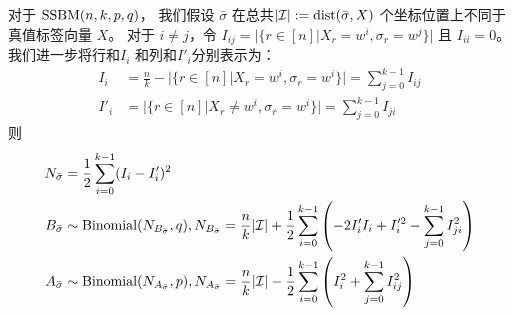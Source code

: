 \begin{lemma}\label{lem:minus}
	对于 $\operatorname{SSBM}(n,k,p,q)$，
  我们假设 $\bar{\sigma}$ 
  在总共$|\mathcal{I}|:=\operatorname{dist}(\bar{\sigma}, X)$ 
  个坐标位置上不同于真值标签向量
  $X$。
	对于 $i\neq j$，令 $I_{ij} = \Big|\{r\in [n] \big| X_r = w^i, \sigma_r = w^j \}\Big|$
  且 $I_{ii} = 0$。
  我们进一步将行和$I_i$
  和列和$I'_i$分别表示为：
  \begin{align}
  I_i &= \frac{n}{k} -
  \Big|\{r\in [n] \big| X_r = w^i, \sigma_r=w^i \}\Big|
  =
  \sum_{j=0}^{k-1} I_{ij} \label{eq:I_i_horizontal} \\
  I'_i &=
  \Big|\{r\in [n] \big| X_r \neq w^i,
  \sigma_r=w^i \}\Big|
  =\sum_{j=0}^{k-1} I_{ji}\label{eq:I_prime_i_vertical}
  \end{align}
	则
\begin{align}
	N_{\bar{\sigma}} &= \frac{1}{2}\sum_{i=0}^{k-1} (I_i - I_i')^2 \label{eq:N_w} \\
	B_{\bar{\sigma}} & \sim \operatorname{Binomial}(N_{B_{\bar{\sigma}}} , q),
  N_{B_{\bar{\sigma}}}=\frac{n}{k}|\mathcal{I}| + \frac{1}{2}\sum_{i=0}^{k-1}  
  \left(-2 I'_i I_i  + I'^2_i - \sum_{j=0}^{k-1} I^2_{ji} \right)
  \label{eq:B_w}\\
	A_{\bar{\sigma}} &
  \sim \operatorname{Binomial}(N_{A_{\bar{\sigma}}}, p),
  N_{A_{\bar{\sigma}}}=
  \frac{n}{k}|\mathcal{I}| - \frac{1}{2}\sum_{i=0}^{k-1}
   \left(I^2_i + \sum_{j=0}^{k-1} I^2_{ij} \right)
  \label{eq:A_w}
	\end{align}
\end{lemma}
